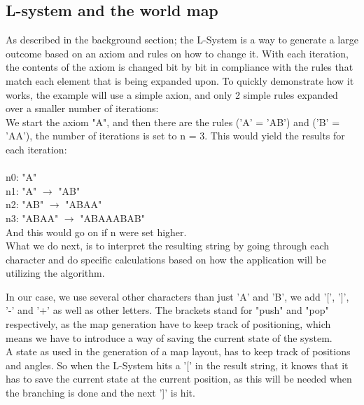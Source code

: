 \subsection{L-system and the world map}

As described in the background section; the L-System is a way to generate a large outcome based on an axiom and rules on how to change it. With each iteration, the contents of the axiom is changed bit by bit in compliance with the rules that match each element that is being expanded upon.
To quickly demonstrate how it works, the example will use a simple axion, and only 2 simple rules expanded over a smaller number of iterations:\\
We start the axiom "A", and then there are the rules ('A' = 'AB') and ('B' = 'AA'), the number of iterations is set to n = 3. This would yield the results for each iteration:\\\\
n0: "A"\\
n1: "A" $\rightarrow$  "AB"\\
n2: "AB"  $\rightarrow$ "ABAA"\\
n3: "ABAA"  $\rightarrow$  "ABAAABAB"\\
And this would go on if n were set higher.\\

What we do next, is to interpret the resulting string by going through each character and do specific calculations based on how the application will be utilizing the algorithm.

In our case, we use several other characters than just 'A' and 'B', we add '[', ']', '-' and '+' as well as other letters. The brackets stand for "push" and "pop" respectively, as the map generation have to keep track of positioning, which means we have to introduce a way of saving the current state of the system.\\

A state as used in the generation of a map layout, has to keep track of positions and angles. So when the L-System hits a '[' in the result string, it knows that it has to save the current state at the current position, as this will be needed when the branching is done and the next ']' is hit. 

